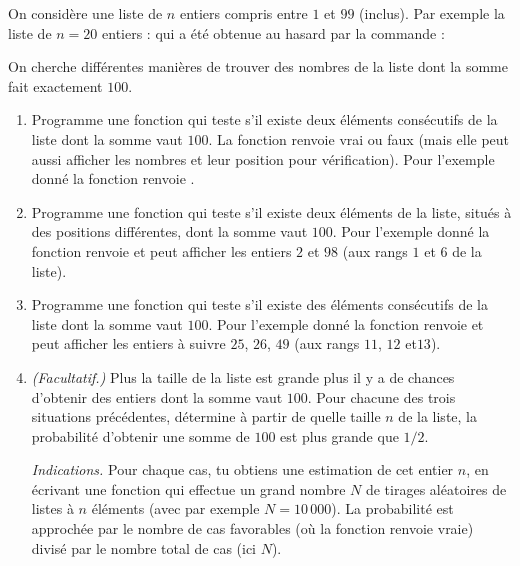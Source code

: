 \documentclass[11pt,class=report,crop=false]{standalone}
\begin{document}

\begin{activite}


On considère une liste de $n$ entiers compris entre $1$ et $99$ (inclus).
Par exemple la liste de $n=20$ entiers :
\mycenterline{\ci{[16,2,85,27,9,45,98,73,12,26,46,25,26,49,18,99,10,86,7,42]}}
qui a été obtenue au hasard par la commande :

On cherche différentes manières de trouver des nombres de la liste dont la somme fait exactement $100$.

\begin{enumerate}
  \item Programme une fonction  qui teste s'il existe deux éléments consécutifs de la liste dont la somme vaut $100$. La fonction renvoie \og{}vrai\fg{} ou \og{}faux\fg{} (mais elle peut aussi afficher les nombres et leur position pour vérification). Pour l'exemple donné la fonction renvoie .
  
  \item Programme une fonction  qui teste s'il existe deux éléments de la liste, situés à des positions différentes, dont la somme vaut $100$. 
 Pour l'exemple donné la fonction renvoie  et peut afficher les entiers $2$ et $98$ (aux rangs $1$ et $6$ de la liste). 
 
 
  \item Programme une fonction  qui teste s'il existe des éléments consécutifs de la liste dont la somme vaut $100$. 
 Pour l'exemple donné la fonction renvoie  et peut afficher les entiers à suivre $25$, $26$, $49$ (aux rangs $11$, $12$ et$13$).
 
 \item \emph{(Facultatif.)} Plus la taille de la liste est grande plus il y a de chances d'obtenir des entiers dont la somme vaut $100$. Pour chacune des trois situations précédentes, détermine à partir de quelle taille $n$ de la liste, la probabilité d'obtenir une somme de $100$ est plus grande que $1/2$. 
 
  \emph{Indications.} Pour chaque cas, tu obtiens une estimation de cet entier $n$, en écrivant une fonction  qui effectue un grand nombre $N$ de tirages aléatoires de listes à $n$ éléments (avec par exemple $N=10\,000$). La probabilité est approchée par le nombre de cas favorables (où la fonction renvoie vraie) divisé par le nombre total de cas (ici $N$).
 
 
  
\end{enumerate}

\end{activite}
\end{document}
